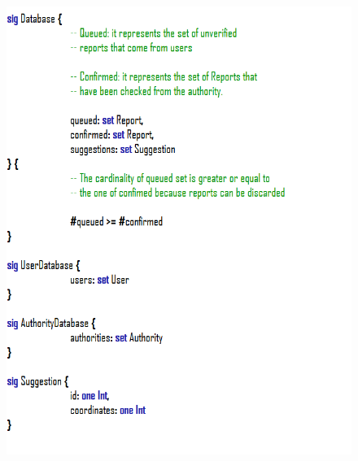\documentclass[12pt,a4paper]{article}
\begin{document}
\begin{figure}[H]
				\centering
				\includegraphics[width=1\linewidth]{../assets/images/exports/user/Sig 2.png}
				\label{fig:signatures}
			\end{figure}
\end{document}
